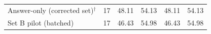 \begin{table}[t]
{\begin{tabular}{lrrrrr}
Answer-only (corrected set)$^{\dagger}$ & 17 & 48.11 & 54.13 & 48.11 & 54.13 \\
Set B pilot (batched) & 17 & 46.43 & 54.98 & 46.43 & 54.98 \\

\end{tabular}}
\end{table}

